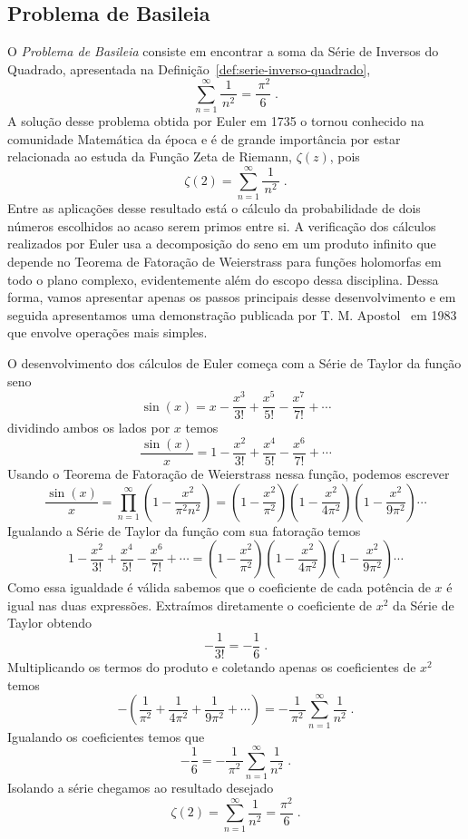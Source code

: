 \subsection{Problema de Basileia}
\label{subsec:problema-Basileia}

O \emph{Problema de Basileia} consiste em
encontrar a soma da Série de Inversos do Quadrado,
apresentada na Definição~\ref{def:serie-inverso-quadrado},
\[
\sum_{n=1}^\infty \frac{1}{\,n^2\,} = \frac{\,\pi^2}{6}    \;.
\]
A solução desse problema obtida por Euler em 1735 o tornou conhecido na comunidade
Matemática da época e é de grande importância
por estar relacionada ao estuda da Função Zeta de Riemann, $\zeta(z)$,
pois
\[
\zeta(2) = \sum_{n=1}^\infty \frac{1}{\,n^2\,}    \;.
\]
Entre as aplicações desse resultado está o cálculo da probabilidade de dois
números escolhidos ao acaso serem primos entre si.
A verificação dos cálculos realizados por Euler usa a decomposição do seno
em um produto infinito que depende no Teorema de Fatoração de Weierstrass
para funções holomorfas
em todo o plano complexo, evidentemente além do escopo dessa disciplina.
Dessa forma, vamos apresentar apenas os passos principais desse desenvolvimento
e em seguida apresentamos uma demonstração
publicada por T. M. Apostol~\cite{Apostol-Proof-Euler-Missed} em 1983
que envolve operações mais simples.

O desenvolvimento dos cálculos de Euler começa com a Série de Taylor da função seno
\[
\sin(x) = x
- \frac{x^3}{3!}
+ \frac{x^5}{5!}
- \frac{x^7}{7!}
+ \cdots
\]
dividindo ambos os lados por $x$ temos
\[
\frac{\sin(x)}{x} = 1
- \frac{x^2}{3!}
+ \frac{x^4}{5!}
- \frac{x^6}{7!}
+ \cdots
\]
Usando o Teorema de Fatoração de Weierstrass nessa função, podemos escrever
\[
\frac{\sin(x)}{x} = \prod_{n=1}^{\infty} \left(1-\frac{x^2}{\pi^2n^2}\right)
= \left(1-\frac{x^2}{ \pi^2}\right)
\left(1-\frac{x^2}{4\pi^2}\right)
\left(1-\frac{x^2}{9\pi^2}\right)
\cdots
\]
Igualando a Série de Taylor da função com sua fatoração temos
\begin{equation}
  \label{eq:fatoracao_seno}
  1
  - \frac{x^2}{3!}
  + \frac{x^4}{5!}
  - \frac{x^6}{7!}
  + \cdots
  = \left(1-\frac{x^2}{ \pi^2}\right)
  \left(1-\frac{x^2}{4\pi^2}\right)
  \left(1-\frac{x^2}{9\pi^2}\right)
  \cdots
\end{equation}
Como essa igualdade é válida sabemos que o coeficiente de cada potência
de $x$ é igual nas duas expressões.
Extraímos diretamente o coeficiente de $x^2$ da Série de Taylor
obtendo
\[
-\frac{1}{3!} = -\frac{1}{6}    \;.
\]
Multiplicando os termos do produto e coletando apenas os
coeficientes de $x^2$ temos
\[
-\left( \frac{1}{ \pi^2}
+ \frac{1}{4\pi^2}
+ \frac{1}{9\pi^2}
+ \cdots
\right)
= - \frac{1}{\,\pi^2\,} \sum_{n=1}^\infty \frac{1}{n^2}    \;.
\]
Igualando os coeficientes temos que
\[
- \frac{1}{6}
= - \frac{1}{\,\pi^2\,} \sum_{n=1}^\infty \frac{1}{n^2}    \;.
\]
Isolando a série chegamos ao resultado desejado
\[
\zeta(2) = \sum_{n=1}^\infty \frac{1}{n^2} = \frac{\pi^2}{6}    \;.
\]

